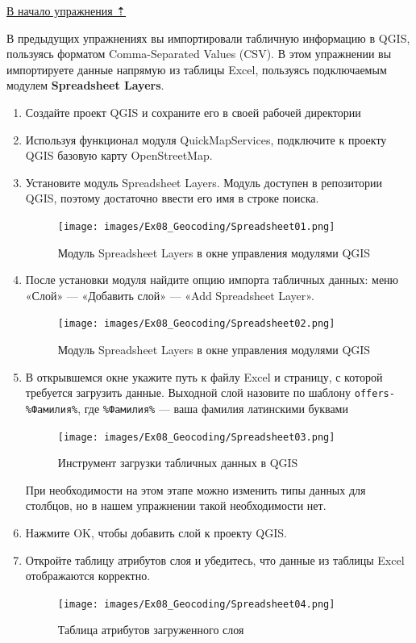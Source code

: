 \documentclass[
  12pt,
]{book}
\begin{document}
\protect\hyperlink{geocoding}{В начало упражнения ⇡}

В предыдущих упражнениях вы импортировали табличную информацию в QGIS, пользуясь форматом Comma-Separated Values (CSV). В этом упражнении вы импортируете данные напрямую из таблицы Excel, пользуясь подключаемым модулем \textbf{Spreadsheet Layers}.

\begin{enumerate}
\def\labelenumi{\arabic{enumi}.}
\item
  Создайте проект QGIS и сохраните его в своей рабочей директории
\item
  Используя функционал модуля QuickMapServices, подключите к проекту QGIS базовую карту OpenStreetMap.
\item
  Установите модуль Spreadsheet Layers. Модуль доступен в репозитории QGIS, поэтому достаточно ввести его имя в строке поиска.

  \begin{figure}
  \centering
  \texttt{[image: images/Ex08\_Geocoding/Spreadsheet01.png]}
  \caption{Модуль Spreadsheet Layers в окне управления модулями QGIS}
  \end{figure}
\item
  После установки модуля найдите опцию импорта табличных данных: меню «Слой» --- «Добавить слой» --- «Add Spreadsheet Layer».

  \begin{figure}
  \centering
  \texttt{[image: images/Ex08\_Geocoding/Spreadsheet02.png]}
  \caption{Модуль Spreadsheet Layers в окне управления модулями QGIS}
  \end{figure}
\item
  В открывшемся окне укажите путь к файлу Excel и страницу, с которой требуется загрузить данные. Выходной слой назовите по шаблону \texttt{offers-\%Фамилия\%}, где \texttt{\%Фамилия\%} --- ваша фамилия латинскими буквами

  \begin{figure}
  \centering
  \texttt{[image: images/Ex08\_Geocoding/Spreadsheet03.png]}
  \caption{Инструмент загрузки табличных данных в QGIS}
  \end{figure}

  При необходимости на этом этапе можно изменить типы данных для столбцов, но в нашем упражнении такой необходимости нет.
\item
  Нажмите OK, чтобы добавить слой к проекту QGIS.
\item
  Откройте таблицу атрибутов слоя и убедитесь, что данные из таблицы Excel отображаются корректно.

  \begin{figure}
  \centering
  \texttt{[image: images/Ex08\_Geocoding/Spreadsheet04.png]}
  \caption{Таблица атрибутов загруженного слоя}
  \end{figure}
\end{enumerate}
\end{document}
